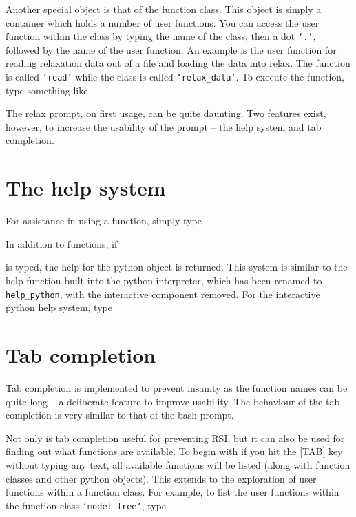 
Another special object is that of the function class.  This object is simply a container which holds a number of user functions.  You can access the user function within the class by typing the name of the class, then a dot \texttt{`.'}, followed by the name of the user function.  An example is the user function for reading relaxation data out of a file and loading the data into relax.  The function is called \texttt{`read'} while the class is called \texttt{`relax\_data'}.  To execute the function, type something like


The relax prompt, on first usage, can be quite daunting.  Two features exist, however, to increase the usability of the prompt -- the help system and tab completion.




\section{The help system}

For assistance in using a function, simply type


In addition to functions, if


is typed, the help for the python object is returned.  This system is similar to the help function built into the python interpreter, which has been renamed to \texttt{help\_python}, with the interactive component removed.  For the interactive python help system, type






\section{Tab completion}

Tab completion is implemented to prevent insanity as the function names can be quite long -- a deliberate feature to improve usability.  The behaviour of the tab completion is very similar to that of the bash prompt.

Not only is tab completion useful for preventing RSI, but it can also be used for finding out what functions are available.  To begin with if you hit the [TAB] key without typing any text, all available functions will be listed (along with function classes and other python objects).  This extends to the exploration of user functions within a function class.  For example, to list the user functions within the function class \texttt{`model\_free'}, type

